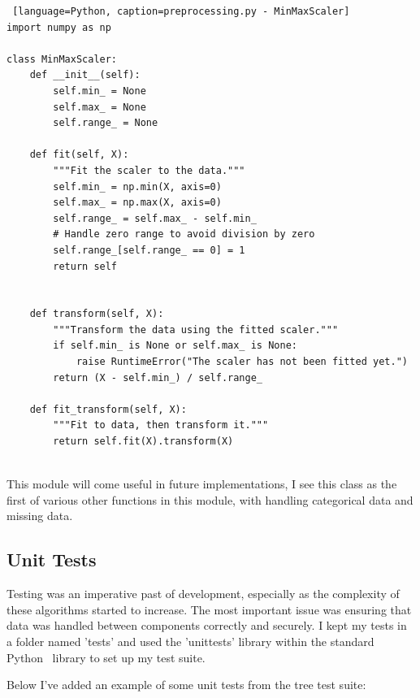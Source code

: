 \documentclass[letterpaper,10pt]{article}
\begin{document}
\begin{lstlisting} [language=Python, caption=preprocessing.py - MinMaxScaler]
import numpy as np

class MinMaxScaler:
    def __init__(self):
        self.min_ = None
        self.max_ = None
        self.range_ = None

    def fit(self, X):
        """Fit the scaler to the data."""
        self.min_ = np.min(X, axis=0)
        self.max_ = np.max(X, axis=0)
        self.range_ = self.max_ - self.min_
        # Handle zero range to avoid division by zero
        self.range_[self.range_ == 0] = 1
        return self
        

    def transform(self, X):
        """Transform the data using the fitted scaler."""
        if self.min_ is None or self.max_ is None:
            raise RuntimeError("The scaler has not been fitted yet.")
        return (X - self.min_) / self.range_

    def fit_transform(self, X):
        """Fit to data, then transform it."""
        return self.fit(X).transform(X)
      
\end{lstlisting}

This module will come useful in future implementations, I see this class as the first of various other functions in this module, with handling categorical data and missing data. \par

\subsection{Unit Tests}
Testing was an imperative past of development, especially as the complexity of these algorithms started to increase. The most important issue was ensuring that data was handled between components correctly and securely. I kept my tests in a folder named 'tests' and used the 'unittests' library within the standard Python~\cite{python3} library to set up my test suite. \par
Below I've added an example of some unit tests from the tree test suite:
\end{document}

